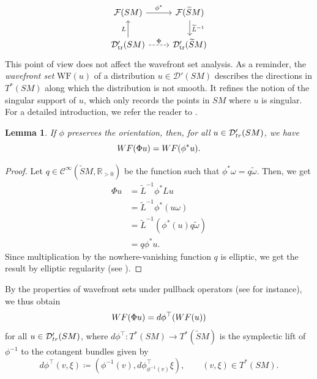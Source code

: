 \documentclass[reqno,12pt,letterpaper]{amsart}
\newtheorem{lemma}[proposition]{Lemma}
\theoremstyle{definition}
\theoremstyle{remark}
\theoremstyle{definition}
\numberwithin{equation}{section}
\newcommand{\R}{\mathbb{R}}
\begin{document}
\begin{equation}\label{eq:definition-phi}
\begin{tikzcd}
\mathcal{F}(SM)\arrow[r, "\phi^*"] & \mathcal{F}(\widetilde{S}M)\arrow[d, "\widetilde{L}^{-1}"]\\
\mathcal{D}_{\text{tr}}'(SM)\arrow[r, "\Phi", dashrightarrow]\arrow[u, "L"] & \mathcal{D}_{\text{tr}}'(\widetilde{S}M)
\end{tikzcd}
\end{equation}
This point of view does not affect the wavefront set analysis. As a reminder, the \textit{wavefront set} $\text{WF}(u)$ of a distribution $u\in \mathcal{D}'(SM)$ describes the directions in $T^*(SM)$ along which the distribution is not smooth. It refines the notion of the singular support of $u$, which only records the points in $SM$ where $u$ is singular. For a detailed introduction, we refer the reader to \cite[Chapter 8]{hormander03}.
\begin{lemma}\label{lemma:wavefrontset-pullback}
If $\phi$ preserves the orientation, then, for all $u\in \mathcal{D}'_{\textup{tr}}(SM)$, we have
$$\textup{WF}(\Phi u)=\textup{WF}(\phi^* u).$$
\end{lemma}
\begin{proof}
Let $q\in \mathcal{C}^\infty(\widetilde{S}M, \R_{>0})$ be the function such that $\phi^*\omega=q\tilde{\omega}$. Then, we get
\begin{equation*}
\begin{alignedat}{1}
\Phi u &= \widetilde{L}^{-1}\phi^* Lu \\
&=\widetilde{L}^{-1}\phi^* (u\omega) \\
&=\widetilde{L}^{-1}(\phi^*(u) q\tilde{\omega})\\
&=q\phi^* u.
\end{alignedat}
\end{equation*}
Since multiplication by the nowhere-vanishing function $q$ is elliptic, we get the result by elliptic regularity (see \cite[Theorem 8.3.2]{hormander03}). 
\end{proof}

By the properties of wavefront sets under pullback operators (see \cite[Theorem 8.2.4]{hormander03} for instance), we thus obtain
$$\textup{WF}(\Phi u)= d\phi^\top(\textup{WF}(u))$$
for all $u\in \mathcal{D}'_{\textup{tr}}(SM)$, where $d\phi^\top: T^*(SM)\to T^*(\widetilde{S}M)$ is the symplectic lift of $\phi^{-1}$ to the cotangent bundles given by
$$d\phi^\top(v, \xi) \coloneqq\left(\phi^{-1}(v), d\phi^\top_{\phi^{-1}(v)} \xi\right), \qquad (v, \xi)\in T^*(SM).$$
\end{document}

